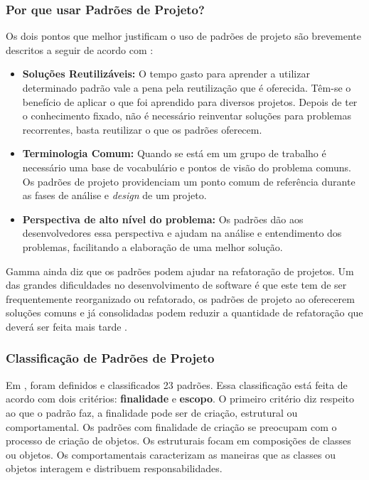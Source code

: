 \subsubsection{Por que usar Padrões de Projeto?}

Os dois pontos que melhor justificam o uso de padrões de projeto são brevemente descritos a seguir de acordo com \cite{Shalloway:Trott:2004}:

\begin{itemize}
	\item \textbf{Soluções Reutilizáveis:} O tempo gasto para aprender a utilizar determinado padrão vale a pena pela reutilização que é oferecida. Têm-se o benefício de aplicar o que foi aprendido para diversos projetos. Depois de ter o conhecimento fixado, não é necessário reinventar soluções para problemas recorrentes, basta reutilizar o que os padrões oferecem.
	\item \textbf{Terminologia Comum:} Quando se está em um grupo de trabalho é necessário uma base de vocabulário e pontos de visão do problema comuns. Os padrões de projeto providenciam um ponto comum de referência durante as fases de análise e \textit{design} de um projeto.
	\item \textbf{Perspectiva de alto nível do problema:} Os padrões dão aos desenvolvedores essa perspectiva e ajudam na análise e entendimento dos problemas, facilitando a elaboração de uma melhor solução.
\end{itemize}

Gamma ainda diz que os padrões podem ajudar na refatoração de projetos. Um das grandes dificuldades no desenvolvimento de software é que este tem de ser frequentemente reorganizado ou refatorado, os padrões de projeto ao oferecerem soluções comuns e já consolidadas podem reduzir a quantidade de refatoração que deverá ser feita mais tarde \cite{Gamma:Helm:Johnson:Vlissides:1995}.

\subsubsection{Classificação de Padrões de Projeto}

Em \cite{Gamma:Helm:Johnson:Vlissides:1995}, foram definidos e classificados 23 padrões. Essa classificação está feita de acordo com dois critérios: \textbf{finalidade} e \textbf{escopo}. O primeiro critério diz respeito ao que o padrão faz, a finalidade pode ser de criação, estrutural ou comportamental. Os padrões com finalidade de criação se preocupam com o processo de criação de objetos. Os estruturais focam em composições de classes ou objetos. Os comportamentais caracterizam as maneiras que as classes ou objetos interagem e distribuem responsabilidades.

